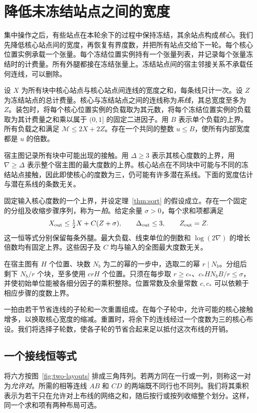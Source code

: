 \section{降低未冻结站点之间的宽度}\label{subsec:core-width}

集中操作之后，有些站点在本轮余下的过程中保持冻结，其余站点构成\emph{核心}。我们先降低核心站点间的宽度，再恢复有界度数，并把所有站点交给下一轮。每个核心位置实例承载一个张量。每个冻结位置实例持有一个张量列表，并记录每个张量冻结时的计费量。所有外腿都接在冻结张量上。冻结站点间的宿主邻接关系不承载任何连线，可以删除。

设 \(X\) 为所有块中核心站点与核心站点间连线的宽度之和，每条线只计一次。设 \(Z\) 为冻结站点的总计费量。核心与冻结站点之间的连线称为\emph{系线}，其总宽度至多为 \(Z\)。装包时，将每个核心位置实例的负载取为其元数，将每个冻结位置实例的负载取为其计费量之和乘以属于 \((0,1]\) 的固定二进因子。用 \(B\) 表示单个负载的上界。所有负载之和满足 \(\mathcal M\le 2X+2Z\)。存在一个共同的整数 \(u\le B\)，使所有内部宽度都是 \(u\) 的倍数。

宿主图记录所有块中可能出现的接触。用 \(\Delta\ge3\) 表示其核心度数的上界，用 \(\nabla\ge\Delta\) 表示整个宿主图的最大度数的上界。核心站点在不同块中可能与不同的冻结站点接触，因此即使核心的度数为三，仍可能有许多潜在系线。下面的宽度估计与潜在系线的条数无关。

\begin{lemma}[核心宽度的缩减]\label{lem:core-width} 固定输入核心度数的一个上界，并设定理~\ref{thm:sort} 的假设成立。存在一个固定的分组及收缩步骤序列，称为一\emph{拍}。给定余量 \(\sigma>0\)，每个求和项都满足 \[
 X_{\rm out}\le \tfrac12 X+C(Z+\sigma),\qquad
 \Delta_{\rm out}\le3,\qquad Z_{\rm out}=Z.
\] 这一恒等式分别保留每条外腿。最大负载、线束单位的倒数和 \(\log(2\nabla)\) 的增长倍数均有固定上界。这些因子及 \(C\) 均与输入的全图最大度数无关。

在宿主图有 \(H\) 个位置、块数 \(N_b\) 为二的幂的一步中，选取二的幂 \(r\mid N_b\)。分组后剩下 \(N_b/r\) 个块，至多使用 \(crH\) 个位置。只须在每步取 \(r\ge c_*\)、\(c_*HN_bB/r\le\sigma\)，并使初始单位能被各细分因子的乘积整除。位置常数及余量常数 \(c,c_*\) 可以依赖于相应步骤的度数上界。\end{lemma}

一拍由若干节省连线的子轮和一次重置组成。在每个子轮中，允许可能的核心接触增多，以换取核心宽度的缩减。重置时，将余下的连线经过一个度数为三的核心布设。我们将选择子轮数，使各子轮的节省合起来足以抵付这次布线的开销。

\subsection{一个接线恒等式} 将六方按图~\ref{fig:two-layouts} 排成三角阵列。若两方同在一行或一列，则称这一对为\emph{允许对}。所需的相等连线 \(AB\) 和 \(CD\) 的两端既不同行也不同列。我们将其乘积表示为若干只在允许对上布线的网络之和，随后按行或按列收缩整个划分。这样，同一个求和项有两种布局可选。

